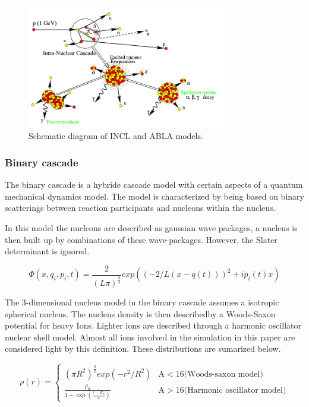 \begin{figure} 
\begin{center}
\includegraphics[width=0.8\textwidth]{images/inclScematic.png}  
\caption{\label{fig:inclschematic} Schematic diagram of INCL and ABLA models.}
 
 \end{center}
 \end{figure}

\subsubsection{Binary cascade}
The binary cascade is a hybride cascade model with certain aspects of a quantum mechanical dynamics model. The model is characterized by being based on binary scatterings between reaction participants and nucleons within the nucleus.

In this model the nucleons are described as gaussian wave packages, a nucleus is then built up by combinations of these wave-packages. However, the Slater determinant is ignored.


\begin{equation}
\Phi(x,q_i,p_i,t) = \frac{2}{(L\pi)^{\frac{3}{4}}}exp((-2/L(x -q(t)))^2+ip_i(t)x)
\label{wavePackage}
\end{equation}


The 3-dimensional nucleus model in the binary cascade assumes a isotropic spherical nucleus. The nucleus density is then describedby a Woods-Saxon potential for heavy Ions. Lighter ions are described through a harmonic oscillator nuclear shell model. Almost all ions involved in the simulation in this paper are considered light by this definition. These distributions are sumarized below.

\begin{equation}
\rho(r) = \begin{cases}
(\pi R^2)^{\frac{3}{2}}exp(-r^2/R^2) & \text{A}<16 \text{(Woods-saxon model)}\\
\frac{\rho_{0}}{1+\exp({\frac{r-R_{0}}{a}})} & \text{A}>16 \text{(Harmonic oscillator model)}
\end{cases}
\label{binaryCascadePotential}
\end{equation}

